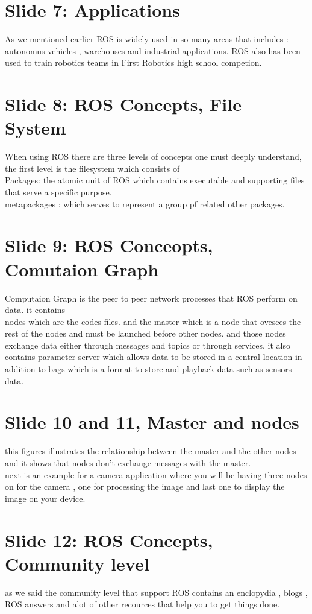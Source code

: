 \documentclass[
12pt,draftcls,onecolumn%
]{IEEEtran}
\begin{document}
\section{Slide 7: Applications}
As we mentioned earlier ROS is widely used in so many areas that includes : autonomus vehicles , warehouses and industrial applications. ROS also has been used to train robotics teams in First Robotics high school competion.
\section{Slide 8: ROS Concepts, File System }
When using ROS there are three levels of concepts one must deeply understand, the first level is the filesystem which consists of
\\Packages: the atomic unit of ROS which contains executable and supporting files that serve a specific purpose. 
\\metapackages : which serves to represent a group pf related other packages.  
\section{Slide 9: ROS Conceopts, Comutaion Graph}
Computaion Graph is the peer to peer network processes that ROS perform on data. it contains \\nodes which are the codes files. and the master which is a node that ovesees the rest of the nodes and must be launched before other nodes. and those nodes exchange data either through messages and topics or through services. it also contains parameter server which allows data to be stored in a central location in addition to bags which is a format to store and playback data such as sensors data.
\section{Slide 10 and 11, Master and nodes}
this figures illustrates the relationship between the master and the other nodes and it shows that nodes don't exchange messages with the master. 
\\next is an example for a camera application where you will be having three nodes on for the camera , one for processing the image and last one to display the image on your device. 
\section{Slide 12: ROS Concepts, Community level}
as we said the community level that support ROS contains an enclopydia , blogs , ROS answers and alot of other recources that help you to get things done. 
\end{document}

